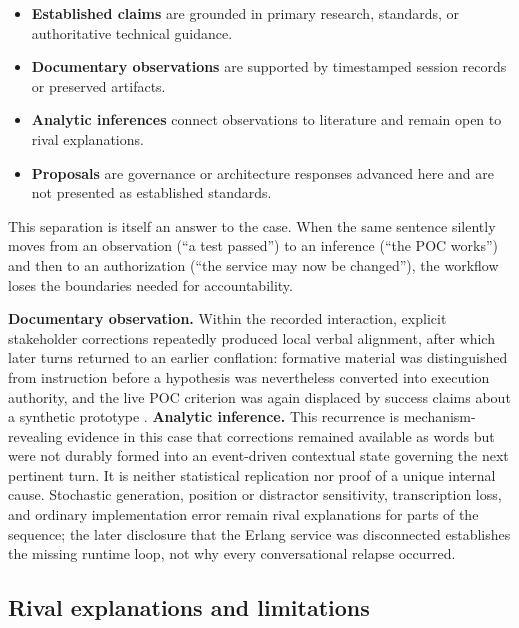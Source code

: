 \documentclass[10pt,a4paper]{article}
\begin{document}
\begin{itemize}
  \item \textbf{Established claims} are grounded in primary research, standards, or authoritative technical guidance.
  \item \textbf{Documentary observations} are supported by timestamped session records or preserved artifacts.
  \item \textbf{Analytic inferences} connect observations to literature and remain open to rival explanations.
  \item \textbf{Proposals} are governance or architecture responses advanced here and are not presented as established standards.
\end{itemize}

This separation is itself an answer to the case. When the same sentence silently moves from an observation (``a test passed'') to an inference (``the POC works'') and then to an authorization (``the service may now be changed''), the workflow loses the boundaries needed for accountability.

\noindent\textbf{Documentary observation.} Within the recorded interaction, explicit stakeholder corrections repeatedly produced local verbal alignment, after which later turns returned to an earlier conflation: formative material was distinguished from instruction before a hypothesis was nevertheless converted into execution authority, and the live POC criterion was again displaced by success claims about a synthetic prototype \cite{sessionrecord}. \textbf{Analytic inference.} This recurrence is mechanism-revealing evidence in this case that corrections remained available as words but were not durably formed into an event-driven contextual state governing the next pertinent turn. It is neither statistical replication nor proof of a unique internal cause. Stochastic generation, position or distractor sensitivity, transcription loss, and ordinary implementation error remain rival explanations for parts of the sequence; the later disclosure that the Erlang service was disconnected establishes the missing runtime loop, not why every conversational relapse occurred.

\subsection{Rival explanations and limitations}
\end{document}
